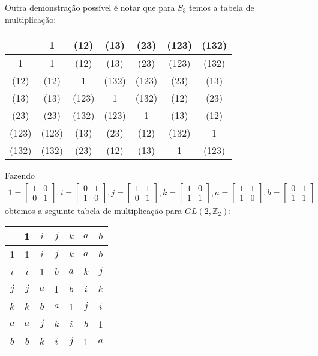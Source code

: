 	\par\vspace{0.3cm} Outra demonstração possível é notar que para $S_3$ temos a tabela de multiplicação:
	\begin{table}[H]
		\centering
		\noindent\begin{tabular}{c|cccccc}
			& 1 & (12) & (13) & (23) & (123) & (132) \\
			\hline
			1 & 1 & (12) & (13) & (23) & (123) & (132) \\
			(12) & (12) & 1 & (132) & (123) & (23) & (13) \\
			(13) & (13) & (123) & 1 & (132) & (12) & (23) \\
			(23) & (23) & (132) & (123) & 1 & (13) & (12) \\
			(123) & (123) & (13) & (23) & (12) & (132) & 1 \\
			(132) & (132) & (23) & (12) & (13) & 1 & (123) \\
		\end{tabular}
	\end{table}
	\par \vspace{0.3cm} Fazendo 
	\begin{align*}
	1 = \begin{bmatrix}
	1 & 0 \\
	0 & 1
	\end{bmatrix}, 
	i = \begin{bmatrix}
	0 & 1 \\
	1 & 0
	\end{bmatrix}, 
	j = \begin{bmatrix}
	1 & 1 \\
	0 & 1
	\end{bmatrix}, 
	k = \begin{bmatrix}
	1 & 0 \\
	1 & 1
	\end{bmatrix},
	a = \begin{bmatrix}
	1 & 1 \\
	1 & 0
	\end{bmatrix}, 
	b = \begin{bmatrix}
	0 & 1 \\
	1 & 1
	\end{bmatrix}
	\end{align*} 
	obtemos a seguinte tabela de multiplicação para $GL(2, \mathbb{Z}_2)$:
	\begin{table}[H]
		\centering
		\noindent\begin{tabular}{c|cccccc}
			& 1 & $i$ & $j$ & $k$ & $a$ & $b$ \\
			\hline
			1 & 1 & $i$ & $j$ & $k$ & $a$ & $b$ \\
			$i$ & $i$ & 1 & $b$ & $a$ & $k$ & $j$ \\
			$j$ & $j$ & $a$ & 1 & $b$ & $i$ & $k$ \\
			$k$ & $k$ & $b$ & $a$ & 1 & $j$ & $i$ \\
			$a$ & $a$ & $j$ & $k$ & $i$ & $b$ & 1 \\
			$b$ & $b$ & $k$ & $i$ & $j$ & 1 & $a$ \\
		\end{tabular}
	\end{table}
